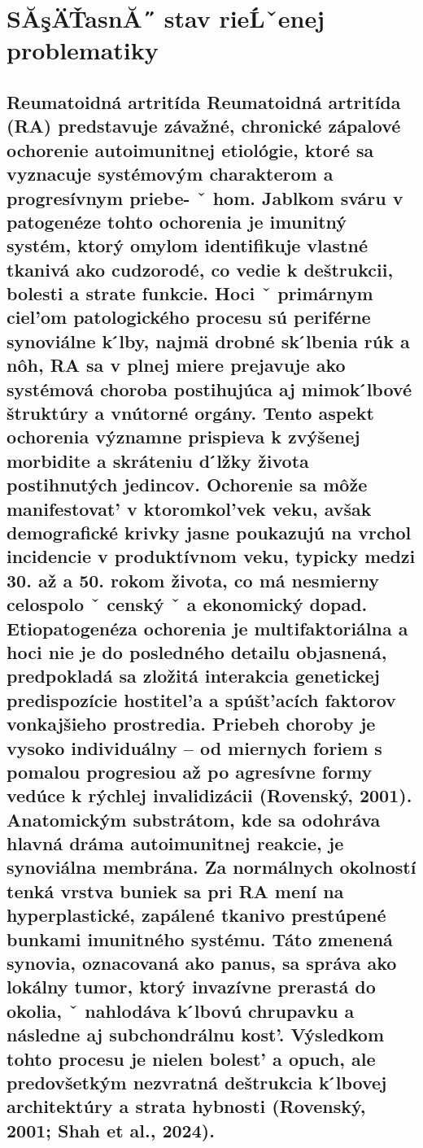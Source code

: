 ﻿%

\chapter{SĂşÄŤasnĂ˝ stav rieĹˇenej problematiky}

\section{Reumatoidná artritída Reumatoidná artritída (RA) predstavuje závažné, chronické zápalové ochorenie autoimunitnej etiológie, ktoré sa vyznacuje systémovým charakterom a progresívnym priebe- ˇ hom. Jablkom sváru v patogenéze tohto ochorenia je imunitný systém, ktorý omylom identifikuje vlastné tkanivá ako cudzorodé, co vedie k deštrukcii, bolesti a strate funkcie. Hoci ˇ primárnym ciel’om patologického procesu sú periférne synoviálne k ́lby, najmä drobné sk ́lbenia rúk a nôh, RA sa v plnej miere prejavuje ako systémová choroba postihujúca aj mimok ́lbové štruktúry a vnútorné orgány. Tento aspekt ochorenia významne prispieva k zvýšenej morbidite a skráteniu d ́lžky života postihnutých jedincov. Ochorenie sa môže manifestovat’ v ktoromkol’vek veku, avšak demografické krivky jasne poukazujú na vrchol incidencie v produktívnom veku, typicky medzi 30. až a 50. rokom života, co má nesmierny celospolo ˇ censký ˇ a ekonomický dopad. Etiopatogenéza ochorenia je multifaktoriálna a hoci nie je do posledného detailu objasnená, predpokladá sa zložitá interakcia genetickej predispozície hostitel’a a spúšt’acích faktorov vonkajšieho prostredia. Priebeh choroby je vysoko individuálny – od miernych foriem s pomalou progresiou až po agresívne formy vedúce k rýchlej invalidizácii (Rovenský, 2001).
 Anatomickým substrátom, kde sa odohráva hlavná dráma autoimunitnej reakcie, je synoviálna membrána. Za normálnych okolností tenká vrstva buniek sa pri RA mení na hyperplastické, zapálené tkanivo prestúpené bunkami imunitného systému. Táto zmenená synovia, oznacovaná ako panus, sa správa ako lokálny tumor, ktorý invazívne prerastá do okolia, ˇ nahlodáva k ́lbovú chrupavku a následne aj subchondrálnu kost’. Výsledkom tohto procesu je nielen bolest’ a opuch, ale predovšetkým nezvratná deštrukcia k ́lbovej architektúry a strata hybnosti (Rovenský, 2001; Shah et al., 2024).
}
